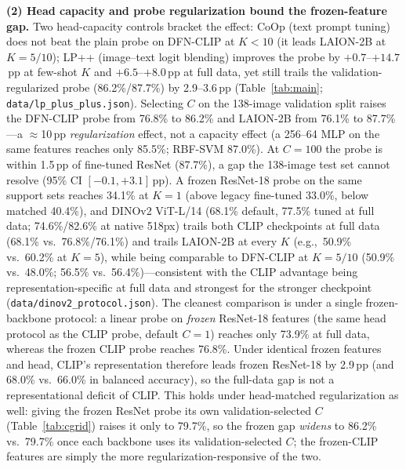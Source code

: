 \documentclass[10pt,a4paper]{article}
\begin{document}
\textbf{(2) Head capacity and probe regularization bound the frozen-feature gap.} Two head-capacity controls bracket the effect: CoOp (text prompt tuning) does not beat the plain probe on DFN-CLIP at $K{<}10$ (it leads LAION-2B at $K{=}5/10$); LP++ (image--text logit blending) improves the probe by $+0.7$--$+14.7$\,pp at few-shot $K$ and $+6.5$--$+8.0$\,pp at full data, yet still trails the validation-regularized probe (86.2\%/87.7\%) by 2.9--3.6\,pp (Table~\ref{tab:main}; \texttt{data/lp\_plus\_plus.json}). Selecting $C$ on the 138-image validation split raises the DFN-CLIP probe from 76.8\% to 86.2\% and LAION-2B from 76.1\% to 87.7\%---a $\approx$10\,pp \emph{regularization} effect, not a capacity effect (a 256--64 MLP on the same features reaches only 85.5\%; RBF-SVM 87.0\%). At $C{=}100$ the probe is within 1.5\,pp of fine-tuned ResNet (87.7\%), a gap the 138-image test set cannot resolve (95\% CI $[-0.1,+3.1]$\,pp). A frozen ResNet-18 probe on the same support sets reaches 34.1\% at $K{=}1$ (above legacy fine-tuned 33.0\%, below matched 40.4\%), and DINOv2 ViT-L/14 (68.1\% default, 77.5\% tuned at full data; 74.6\%/82.6\% at native 518px) trails both CLIP checkpoints at full data (68.1\% vs.\ 76.8\%/76.1\%) and trails LAION-2B at every $K$ (e.g.,\ 50.9\% vs.\ 60.2\% at $K{=}5$), while being comparable to DFN-CLIP at $K{=}5/10$ (50.9\% vs.\ 48.0\%; 56.5\% vs.\ 56.4\%)---consistent with the CLIP advantage being representation-specific at full data and strongest for the stronger checkpoint (\texttt{data/dinov2\_protocol.json}).
The cleanest comparison is under a single frozen-backbone protocol: a linear probe on \emph{frozen} ResNet-18 features (the same head protocol as the CLIP probe, default $C{=}1$) reaches only 73.9\% at full data, whereas the frozen CLIP probe reaches 76.8\%. Under identical frozen features and head, CLIP's representation therefore leads frozen ResNet-18 by 2.9\,pp (and 68.0\% vs.\ 66.0\% in balanced accuracy), so the full-data gap is not a representational deficit of CLIP. This holds under head-matched regularization as well: giving the frozen ResNet probe its own validation-selected $C$ (Table~\ref{tab:cgrid}) raises it only to 79.7\%, so the frozen gap \emph{widens} to 86.2\% vs.\ 79.7\% once each backbone uses its validation-selected $C$; the frozen-CLIP features are simply the more regularization-responsive of the two.
\end{document}
